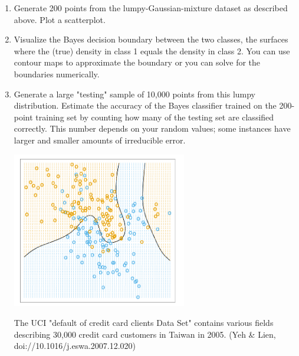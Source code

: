 \documentclass[12pt]{book}
\theoremstyle{definition}
\begin{document}
\begin{enumerate}
\item 
Generate 200 points from the lumpy-Gaussian-mixture dataset as described above.  Plot a scatterplot.

\item
Visualize the Bayes decision boundary between the two classes, the surfaces where the (true) density in class 1 equals the density in class 2.  You can use contour maps to approximate the boundary or you can solve for the boundaries numerically.

\item
Generate a large "testing" sample of 10,000 points from this lumpy distribution.
Estimate the accuracy of the Bayes classifier trained on the 200-point training set by counting how many of the testing set are classified correctly.  This number depends on your random values; some instances have larger and smaller amounts of irreducible error.

\includegraphics[width=3in]{src/hastie-bayesian.png}




The UCI "default of credit card clients Data Set" contains various fields describing 30,000 credit card customers in Taiwan in 2005. (Yeh \& Lien,  doi://10.1016/j.eswa.2007.12.020)   


\end{enumerate}
\end{document}

